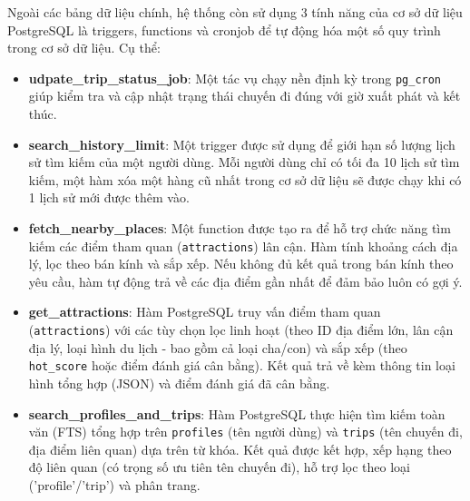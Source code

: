 Ngoài các bảng dữ liệu chính, hệ thống còn sử dụng 3 tính năng của cơ sở dữ liệu PostgreSQL là triggers, functions và cronjob để tự động hóa một số quy trình trong cơ sở dữ liệu. Cụ thể:
\begin{itemize}
    \item \textbf{udpate\_trip\_status\_job}: Một tác vụ chạy nền định kỳ trong \texttt{pg\_cron} giúp kiểm tra và cập nhật trạng thái chuyến đi đúng với giờ xuất phát và kết thúc.
    
    \item \textbf{search\_history\_limit}: Một trigger được sử dụng để giới hạn số lượng lịch sử tìm kiếm của một người dùng. Mỗi người dùng chỉ có tối đa 10 lịch sử tìm kiếm, một hàm xóa một hàng cũ nhất trong cơ sở dữ liệu sẽ được chạy khi có 1 lịch sử mới được thêm vào. 
    \item \textbf{fetch\_nearby\_places}: Một function được tạo ra để hỗ trợ chức năng tìm kiếm các điểm tham quan (\texttt{attractions}) lân cận. Hàm tính khoảng cách địa lý, lọc theo bán kính và sắp xếp. Nếu không đủ kết quả trong bán kính theo yêu cầu, hàm tự động trả về các địa điểm gần nhất để đảm bảo luôn có gợi ý.
    \item \textbf{get\_attractions}: Hàm PostgreSQL truy vấn điểm tham quan (\texttt{attractions}) với các tùy chọn lọc linh hoạt (theo ID địa điểm lớn, lân cận địa lý, loại hình du lịch - bao gồm cả loại cha/con) và sắp xếp (theo \texttt{hot\_score} hoặc điểm đánh giá cân bằng). Kết quả trả về kèm thông tin loại hình tổng hợp (JSON) và điểm đánh giá đã cân bằng.

    \item \textbf{search\_profiles\_and\_trips}: Hàm PostgreSQL thực hiện tìm kiếm toàn văn (FTS) tổng hợp trên \texttt{profiles} (tên người dùng) và \texttt{trips} (tên chuyến đi, địa điểm liên quan) dựa trên từ khóa. Kết quả được kết hợp, xếp hạng theo độ liên quan (có trọng số ưu tiên tên chuyến đi), hỗ trợ lọc theo loại ('profile'/'trip') và phân trang.

\end{itemize}

